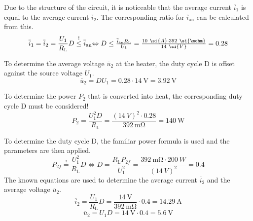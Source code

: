 \begin{solutionblock}

    Due to the structure of the circuit, it is noticeable that the average current $\overline i_1$ is equal to the average current $\overline i_2$. The corresponding ratio for $\overline i_{\mathrm{an}}$ can be calculated from this.
\begin{equation}
\overline i_1 = \overline i_2 = \frac{U_1}{ R_{\mathrm{L}}}  D \overset ! \leq {\overline i_{\mathrm{an}}}$$
 $$\Leftrightarrow D \leq \frac{ {\overline i_{\mathrm{an}}}  R_{\mathrm{L}}}{U_1} = \frac{10 \ \si{A} \cdot {392\ \si{\mohm}}} {14\ \si{V}} = 0.28
\end{equation}

To determine the average voltage $\overline u_2$ at the heater, the duty cycle D is offset against the source voltage $U_1$.
 \begin{equation}
 \overline u_2 = D  U_1 = 0.28 \cdot \SI{14}{\volt} = \SI{3.92}{\volt}
\end{equation}

To determine the power $P_2$ that is converted into heat, the corresponding duty cycle D must be considered!
 \begin{equation}
 P_2 = \frac{U_1^2 D}{ R_{\mathrm{L}}} = \frac{(14\ \si{V})^2 \cdot 0.28}{392\ \si{\mohm}}= \SI{140}{\watt}   
\end{equation}
\end{solutionblock}

     \begin{solutionblock}
        To determine the duty cycle D, the familiar power formula is used and the parameters are then applied.
  \begin{equation}
P_{2f} \overset ! = \frac{U_1^2}{ R_{\mathrm{L}}} D
 \Leftrightarrow D = \frac{ R_{\mathrm{L}}  P_{2f}}{U_1^2} = \frac{{392\ \si{\mohm}} \cdot 200 \ \si{W}}{(14\ \si{V})^2} = 0.4
\end{equation}
The known equations are used to determine the average current $\overline i_2$ and the average voltage $\overline u_2$.
 \begin{equation}
 \overline i_2 = \frac{U_1}{ R_{\mathrm{L}}} D = \frac{\SI{14}{\volt}}{392\ \si{\mohm}} \cdot 0.4 = \SI{14.29}{\ampere}
\end{equation}
\begin{equation}
 \overline u_2 = U_1 D = {\SI{14}{\volt}} \cdot 0.4 = \SI{5.6}{\volt}
\end{equation}
\end{solutionblock}

